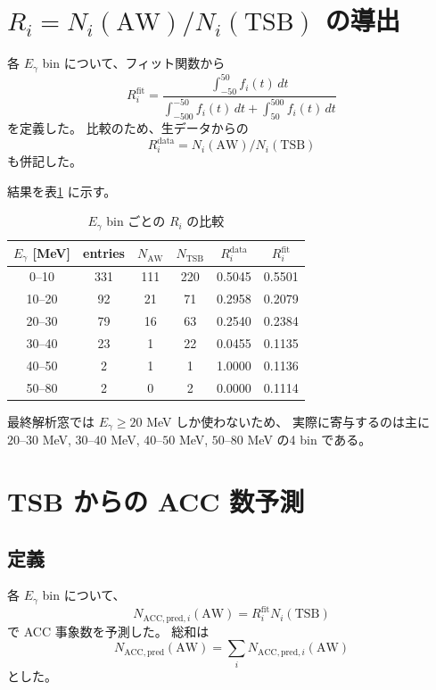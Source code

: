 \documentclass[a4paper,11pt]{jsarticle}
\begin{document}
\section{\(R_i = N_i(\mathrm{AW}) / N_i(\mathrm{TSB})\) の導出}
各 \(E_\gamma\) bin について、フィット関数から
\begin{equation}
R_i^{\mathrm{fit}} =
\frac{
\int_{-50}^{50} f_i(t)\,dt
}{
\int_{-500}^{-50} f_i(t)\,dt
+
\int_{50}^{500} f_i(t)\,dt
}
\end{equation}
を定義した。
比較のため、生データからの
\[
R_i^{\mathrm{data}} = N_i(\mathrm{AW}) / N_i(\mathrm{TSB})
\]
も併記した。

結果を表\ref{tab:rvalues} に示す。

\begin{table}[htbp]
\centering
\caption{\(E_\gamma\) bin ごとの \(R_i\) の比較}
\label{tab:rvalues}
\begin{tabular}{cccccc}
\toprule
\(E_\gamma\) [MeV] & entries & \(N_{\mathrm{AW}}\) & \(N_{\mathrm{TSB}}\) & \(R_i^{\mathrm{data}}\) & \(R_i^{\mathrm{fit}}\) \\
\midrule
0--10  & 331 & 111 & 220 & 0.5045 & 0.5501 \\
10--20 &  92 &  21 &  71 & 0.2958 & 0.2079 \\
20--30 &  79 &  16 &  63 & 0.2540 & 0.2384 \\
30--40 &  23 &   1 &  22 & 0.0455 & 0.1135 \\
40--50 &   2 &   1 &   1 & 1.0000 & 0.1136 \\
50--80 &   2 &   0 &   2 & 0.0000 & 0.1114 \\
\bottomrule
\end{tabular}
\end{table}

最終解析窓では \(E_\gamma \ge 20\) MeV しか使わないため、
実際に寄与するのは主に
\(20\text{--}30\) MeV, \(30\text{--}40\) MeV, \(40\text{--}50\) MeV, \(50\text{--}80\) MeV
の4 bin である。

\section{TSB からの ACC 数予測}
\subsection{定義}
各 \(E_\gamma\) bin について、
\begin{equation}
N_{\mathrm{ACC,pred},i}(\mathrm{AW})
=
R_i^{\mathrm{fit}} N_i(\mathrm{TSB})
\end{equation}
で ACC 事象数を予測した。
総和は
\begin{equation}
N_{\mathrm{ACC,pred}}(\mathrm{AW})
=
\sum_i N_{\mathrm{ACC,pred},i}(\mathrm{AW})
\end{equation}
とした。
\end{document}

